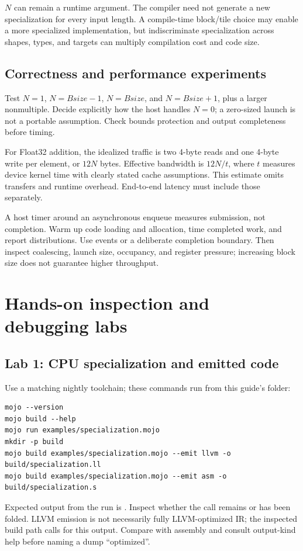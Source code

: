 \documentclass[11pt,a4paper]{article}
\newcommand{\code}[1]{\texttt{\detokenize{#1}}}
\newcommand{\chapterpage}[1]{\clearpage\section{#1}}
\begin{document}
\(N\) can remain a runtime argument. The compiler need not generate a new specialization for every input length. A compile-time block/tile choice may enable a more specialized implementation, but indiscriminate specialization across shapes, types, and targets can multiply compilation cost and code size.

\subsection{Correctness and performance experiments}
Test \(N=1\), \(N=Bsize-1\), \(N=Bsize\), and \(N=Bsize+1\), plus a larger nonmultiple. Decide explicitly how the host handles \(N=0\); a zero-sized launch is not a portable assumption. Check bounds protection and output completeness before timing.

For Float32 addition, the idealized traffic is two 4-byte reads and one 4-byte write per element, or \(12N\) bytes. Effective bandwidth is \(12N/t\), where \(t\) measures device kernel time with clearly stated cache assumptions. This estimate omits transfers and runtime overhead. End-to-end latency must include those separately.

A host timer around an asynchronous enqueue measures submission, not completion. Warm up code loading and allocation, time completed work, and report distributions. Use events or a deliberate completion boundary. Then inspect coalescing, launch size, occupancy, and register pressure; increasing block size does not guarantee higher throughput.

\chapterpage{Hands-on inspection and debugging labs}
\subsection{Lab 1: CPU specialization and emitted code}
Use a matching nightly toolchain; these commands run from this guide's folder:
\begin{lstlisting}
mojo --version
mojo build --help
mojo run examples/specialization.mojo
mkdir -p build
mojo build examples/specialization.mojo --emit llvm -o build/specialization.ll
mojo build examples/specialization.mojo --emit asm -o build/specialization.s
\end{lstlisting}
Expected output from the run is \code{11}. Inspect whether the call remains or has been folded. LLVM emission is not necessarily fully LLVM-optimized IR; the inspected build path calls \code{lowerAllFuncsToLLVM} for this output. Compare with assembly and consult output-kind help before naming a dump ``optimized''.
\end{document}
